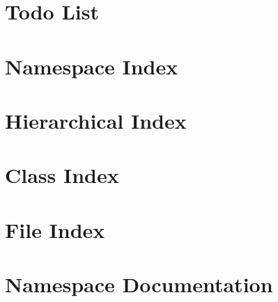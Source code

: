 \documentclass[twoside]{book}
\begin{document}
\chapter{Todo List}
\label{todo}
\hypertarget{todo}{}

\chapter{Namespace Index}

\chapter{Hierarchical Index}

\chapter{Class Index}

\chapter{File Index}

\chapter{Namespace Documentation}




\end{document}
